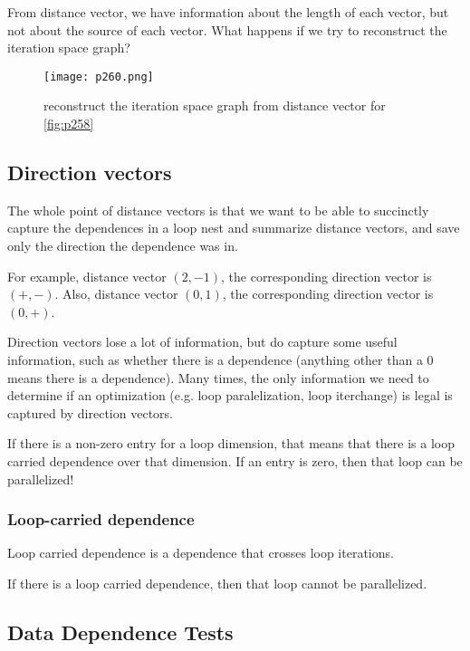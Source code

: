 From distance vector, we have information about the length of each vector,
but not about the source of each vector. What happens if we try to reconstruct the iteration space graph?



\begin{figure}[H]
    \centering
    \texttt{[image: p260.png]}
    \caption{reconstruct the iteration
    space graph from distance vector for \ref{fig:p258}}
    \label{fig:p260}
\end{figure}


\subsection{Direction vectors}

The whole point of distance vectors is that we want to be able to
succinctly capture the dependences in a loop nest and summarize distance vectors, and save only the direction the
dependence was in.


For example, distance vector $(2,-1)$, the corresponding direction vector is $(+,-)$.
Also, distance vector $(0,1)$, the corresponding direction vector is $(0,+)$.

Direction vectors lose a lot of information, but do capture
some useful information, such as whether there is a dependence (anything other than a
$0$ means there is a dependence). 
Many times, the only information we need to determine if
an optimization (e.g. loop paralelization, loop iterchange) is legal is captured by direction vectors. 



If there is a non-zero entry for a loop dimension, that
means that there is a loop carried dependence over that
dimension. If an entry is zero, then that loop can be parallelized!





\subsubsection{Loop-carried dependence}

Loop carried dependence is a dependence that crosses loop iterations.

If there is a  loop carried dependence, then that loop cannot
be parallelized. 


\subsection{Data Dependence Tests}


